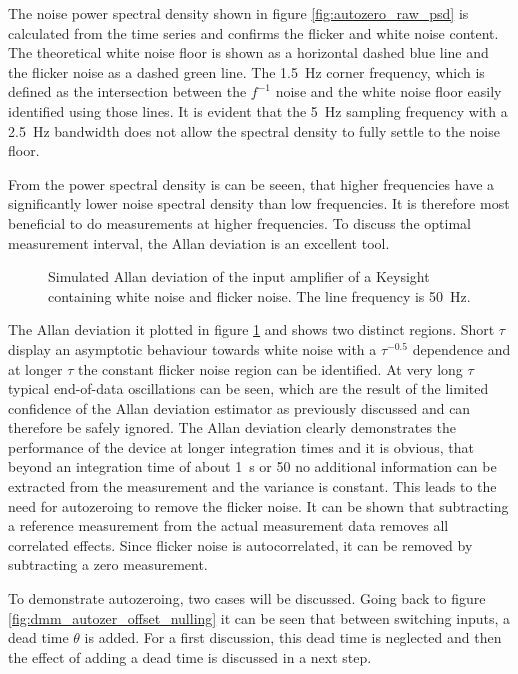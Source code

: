 The noise power spectral density shown in figure \ref{fig:autozero_raw_psd} is calculated from the time series and confirms the flicker and white noise content. The theoretical white noise floor is shown as a horizontal dashed blue line and the flicker noise as a dashed green line. The \qty{1.5}{\Hz} corner frequency, which is defined as the intersection between the $f^{-1}$ noise and the white noise floor easily identified using those lines. It is evident that the \qty{5}{\Hz} sampling frequency with a \qty{2.5}{\Hz} bandwidth does not allow the spectral density to fully settle to the noise floor.

From the power spectral density is can be seeen, that higher frequencies have a significantly lower noise spectral density than low frequencies. It is therefore most beneficial to do measurements at higher frequencies. To discuss the optimal measurement interval, the Allan deviation is an excellent tool.

\begin{figure}[ht]
    \centering
    
    \caption{Simulated Allan deviation of the input amplifier of a Keysight  containing white noise and flicker noise. The line frequency is \qty{50}{\Hz}.}
    \label{fig:autozero_raw_adev}
\end{figure}

The Allan deviation it plotted in figure \ref{fig:autozero_raw_adev} and shows two distinct regions. Short $\tau$ display an asymptotic behaviour towards white noise with a $\tau^{−0.5}$ dependence and at longer $\tau$ the constant flicker noise region can be identified. At very long $\tau$ typical end-of-data oscillations can be seen, which are the result of the limited confidence of the Allan deviation estimator as previously discussed and can therefore be safely ignored. The Allan deviation clearly demonstrates the performance of the device at longer integration times and it is obvious, that beyond an integration time of about \qty{1}{\second} or \qty{50}{\plc} no additional information can be extracted from the measurement and the variance is constant. This leads to the need for autozeroing to remove the flicker noise. It can be shown \cite{autozero_with_dead_time} that subtracting a reference measurement from the actual measurement data removes all correlated effects. Since flicker noise is autocorrelated, it can be removed by subtracting a zero measurement.

To demonstrate autozeroing, two cases will be discussed. Going back to figure \ref{fig:dmm_autozer_offset_nulling} it can be seen that between switching inputs, a dead time $\theta$ is added. For a first discussion, this dead time is neglected and then the effect of adding a dead time is discussed in a next step.

